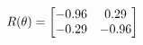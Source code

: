 \documentclass[preview]{standalone}
\begin{document}
\begin{align*}
\special{dvisvgm:raw <g id='unique000'>}R(\theta) = \begin{bmatrix}-0.96 & 0.29\\-0.29 & -0.96\end{bmatrix}\special{dvisvgm:raw </g>}
\end{align*}
\end{document}
